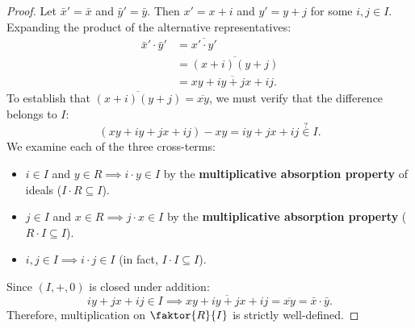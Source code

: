 \begin{content}
\end{content}

\begin{content}

\begin{proof}
Let $\bar{x}' = \bar{x}$ and $\bar{y}' = \bar{y}$. Then $x' = x + i$ and $y' = y + j$ for some $i, j \in I$. Expanding the product of the alternative representatives:
\begin{align*}
\bar{x}' \cdot \bar{y}' &= \overline{x' \cdot y'} \\
&= \overline{(x + i)(y + j)} \\
&= \overline{x y + i y + j x + i j}.
\end{align*}
To establish that $\overline{(x + i)(y + j)} = \overline{x y}$, we must verify that the difference belongs to $I$:
\[
(x y + i y + j x + i j) - x y = i y + j x + i j \stackrel{?}{\in} I.
\]
We examine each of the three cross-terms:
\begin{itemize}
    \item $i \in I$ and $y \in R \implies i \cdot y \in I$ by the \textbf{multiplicative absorption property} of ideals ($I \cdot R \subseteq I$).
    \item $j \in I$ and $x \in R \implies j \cdot x \in I$ by the \textbf{multiplicative absorption property} ($R \cdot I \subseteq I$).
    \item $i, j \in I \implies i \cdot j \in I$ (in fact, $I \cdot I \subseteq I$).
\end{itemize}
Since $(I, +, 0)$ is closed under addition:
\[
i y + j x + i j \in I \implies \overline{x y + i y + j x + i j} = \overline{x y} = \bar{x} \cdot \bar{y}.
\]
Therefore, multiplication on $\faktor{R}{I}$ is strictly well-defined.
\end{proof}


\end{content}
